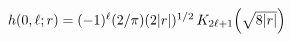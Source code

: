 $\mathop{h\/}\nolimits\!\left(0,\ell;r\right)=(-1)^{\ell}(2/\pi)(2|r|)^{1/2}%
\mathop{K_{2\ell+1}\/}\nolimits\!\left(\sqrt{8|r|}\right)$